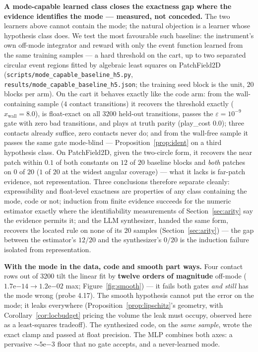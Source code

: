 \documentclass[11pt]{article}
\theoremstyle{definition}
\theoremstyle{remark}
\begin{document}
\textbf{A mode-capable learned class closes the exactness gap where the evidence identifies the mode --- measured, not conceded.} The two learners above cannot contain the mode; the natural objection is a learner whose hypothesis class does. We test the most favourable such baseline: the instrument's own off-mode integrator and reward with only the event function learned from the same training samples --- a hard threshold on the cart, up to two separated circular event regions fitted by algebraic least squares on PatchField2D (\texttt{scripts/\allowbreak mode\_\allowbreak capable\_\allowbreak baseline\_\allowbreak h5.py}, \texttt{results/\allowbreak mode\_\allowbreak capable\_\allowbreak baseline\_\allowbreak h5.json}; the training seed block is the unit, $20$ blocks per arm). On the cart it behaves exactly like the code arm: from the wall-containing sample ($4$ contact transitions) it recovers the threshold exactly ($\hat x_\mathrm{wall} = 8.0$), is float-exact on all $3200$ held-out transitions, passes the $\varepsilon = 10^{-9}$ gate with zero bad transitions, and plays at truth parity (play\_cost $0.0$); three contacts already suffice, zero contacts never do; and from the wall-free sample it passes the same gate mode-blind --- Proposition~\ref{prop:ident} on a third hypothesis class. On PatchField2D, given the two-circle form, it recovers the near patch within $0.1$ of both constants on $12$ of $20$ baseline blocks and \emph{both} patches on $0$ of $20$ ($1$ of $20$ at the widest angular coverage) --- what it lacks is far-patch evidence, not representation. Three conclusions therefore separate cleanly: expressibility and float-level exactness are properties of any class containing the mode, code or not; induction from finite evidence succeeds for the numeric estimator exactly where the identifiability measurements of Section~\ref{sec:arity} say the evidence permits it; and the LLM synthesizer, handed the same form, recovers the located rule on none of its $20$ samples (Section~\ref{sec:arity}) --- the gap between the estimator's $12/20$ and the synthesizer's $0/20$ is the induction failure isolated from representation.

\textbf{With the mode in the data, code and smooth part ways.} Four contact rows out of 3200 tilt the linear fit by \textbf{twelve orders of magnitude} off-mode ($1.7\mathrm{e}{-14} \to 1.2\mathrm{e}{-02}$ max; Figure~\ref{fig:smooth}) --- it fails both gates \emph{and still} has the mode wrong (probe 4.17). The smooth hypothesis cannot put the error on the mode; it leaks everywhere (Proposition~\ref{prop:lipschitz}'s geometry, with Corollary~\ref{cor:locbudget} pricing the volume the leak must occupy, observed here as a least-squares tradeoff). The synthesized code, on the \emph{same sample}, wrote the exact clamp and passed at float precision. The MLP combines both axes: a pervasive ${\sim}5\mathrm{e}{-3}$ floor that no gate accepts, and a never-learned mode.
\end{document}
